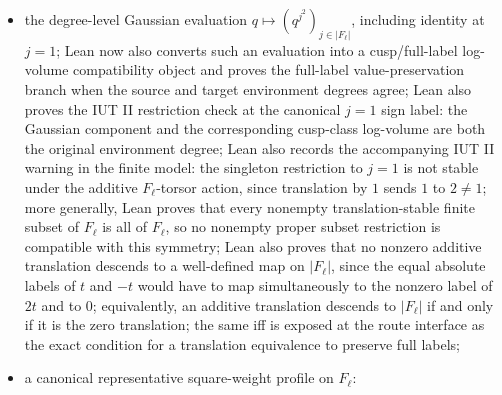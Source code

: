 \documentclass[11pt]{article}
\begin{document}
\begin{itemize}
  \((\ell+1)/2\), matching the \(j\in\{0,\ldots,(\ell-1)/2\}\) convention in
  IUT II; on this half-range procession, Lean proves the Gaussian degree formula
  \(G(j)=j^2\deg(q)\), with \(G(0)=0\), and the normalized average identity
  \(6\,\operatorname{Avg}(G)=j_{\max}(2j_{\max}+1)\deg(q)\); by reindexing,
  the same identity holds for the average over \(|F_\ell|\).  Since
  \(j_{\max}\ge2\), Lean proves that this full average is not the singleton
  \(j=1\) identity value when \(\deg(q)\ne0\); in the nonpositive environment
  branch, the full \(|F_\ell|\)-average is bounded above by \(\deg(q)\), and
  hence by any bound above \(\deg(q)\); if \(\deg(q)<0\), this bound is strict:
  the full average is \(<\deg(q)\), while for \(\deg(q)>0\) it is \(>\deg(q)\);
  the same facts are now packaged as a
  typed \(|F_\ell|\)-indexed procession-normalized average object, where the
  average is provably distinct from the canonical \(j=1\) component unless
  \(\deg(q)=0\), strictly below it if \(\deg(q)<0\), strictly above it if
  \(\deg(q)>0\), and equal to that component if and only if \(\deg(q)=0\);
\item the degree-level Gaussian evaluation
  \(q\mapsto(q^{j^2})_{j\in |F_\ell|}\), including identity at \(j=1\);
  Lean now also converts such an evaluation into a cusp/full-label log-volume
  compatibility object and proves the full-label value-preservation branch when
  the source and target environment degrees agree; Lean also proves the IUT II
  restriction check at the canonical \(j=1\) sign label:
  the Gaussian component and the corresponding cusp-class log-volume are both
  the original environment degree; Lean also records the accompanying IUT II
  warning in the finite model: the singleton restriction to \(j=1\) is not
  stable under the additive \(F_\ell\)-torsor action, since translation by \(1\)
  sends \(1\) to \(2\ne1\); more generally, Lean proves that every nonempty
  translation-stable finite subset of \(F_\ell\) is all of \(F_\ell\), so no
  nonempty proper subset restriction is compatible with this symmetry; Lean
  also proves that no nonzero additive translation descends to a well-defined
  map on \(|F_\ell|\), since the equal absolute labels of \(t\) and \(-t\) would
  have to map simultaneously to the nonzero label of \(2t\) and to \(0\);
  equivalently, an additive translation descends to \(|F_\ell|\) if and only if
  it is the zero translation; the same iff is exposed at the route interface as
  the exact condition for a translation equivalence to preserve full labels;
\item a canonical representative square-weight profile on \(F_\ell\):

\end{itemize}
\end{document}
